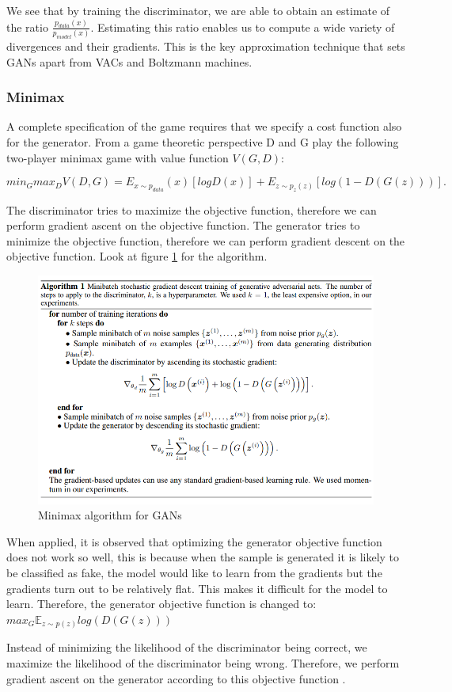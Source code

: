 \documentclass{scrartcl}
\begin{document}
We see that by training the discriminator, we are able to obtain an estimate of the ratio $\frac{p_{data}(x)}{p_{model}(x)}$. Estimating this ratio enables us to compute a wide variety of divergences and their gradients. This is the key approximation technique that sets GANs apart from VACs and Boltzmann machines.
\subsubsection{Minimax}
A complete specification of the game requires that we specify a cost function also for the generator. From a game theoretic perspective D and G play the following two-player minimax game with value function $V(G, D)$:

$$min_G max_D V (D, G) = E_{x\sim{}p_{data}}(x)[log D(x)] + E_{z\sim{}p_z(z)}[log(1 - D(G(z)))].$$

The discriminator tries to maximize the objective function, therefore we can perform gradient ascent on the objective function. The generator tries to minimize the objective function, therefore we can perform gradient descent on the objective function. Look at figure \ref{fig:gan_minmax} for the algorithm.

\begin{figure}
	\centering
		\includegraphics[scale=0.5]{img/gan_minmax}
	\caption{Minimax algorithm for GANs \cite{goodfellow2014generative}}
	\label{fig:gan_minmax}
\end{figure}

When applied, it is observed that optimizing the generator objective function does not work so well, this is because when the sample is generated it is likely to be classified as fake, the model would like to learn from the gradients but the gradients turn out to be relatively flat. This makes it difficult for the model to learn. Therefore, the generator objective function is changed to: $max_{G} \mathbb{E}_{z \sim{}p(z)} log(D(G(z)))$

Instead of minimizing the likelihood of the discriminator being correct, we maximize the likelihood of the discriminator being wrong. Therefore, we perform gradient ascent on the generator according to this objective function \cite{gansexpl-tds}.



\newpage


\end{document}
